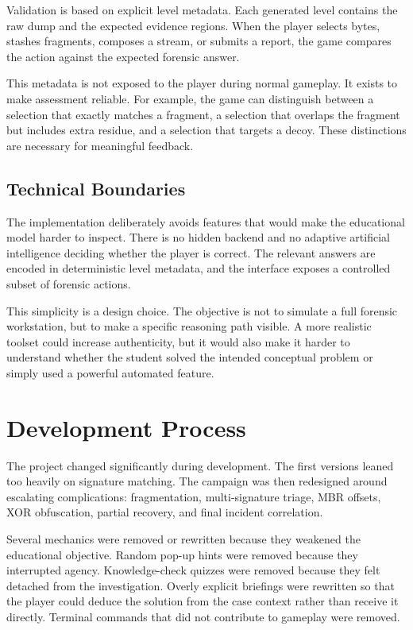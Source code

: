 \documentclass[11pt,a4paper]{article}
\begin{document}
Validation is based on explicit level metadata. Each generated level contains the raw dump and the expected evidence regions. When the player selects bytes, stashes fragments, composes a stream, or submits a report, the game compares the action against the expected forensic answer.

This metadata is not exposed to the player during normal gameplay. It exists to make assessment reliable. For example, the game can distinguish between a selection that exactly matches a fragment, a selection that overlaps the fragment but includes extra residue, and a selection that targets a decoy. These distinctions are necessary for meaningful feedback.

\subsection{Technical Boundaries}

The implementation deliberately avoids features that would make the educational model harder to inspect. There is no hidden backend and no adaptive artificial intelligence deciding whether the player is correct. The relevant answers are encoded in deterministic level metadata, and the interface exposes a controlled subset of forensic actions.

This simplicity is a design choice. The objective is not to simulate a full forensic workstation, but to make a specific reasoning path visible. A more realistic toolset could increase authenticity, but it would also make it harder to understand whether the student solved the intended conceptual problem or simply used a powerful automated feature.

\section{Development Process}

The project changed significantly during development. The first versions leaned too heavily on signature matching. The campaign was then redesigned around escalating complications: fragmentation, multi-signature triage, MBR offsets, XOR obfuscation, partial recovery, and final incident correlation.

Several mechanics were removed or rewritten because they weakened the educational objective. Random pop-up hints were removed because they interrupted agency. Knowledge-check quizzes were removed because they felt detached from the investigation. Overly explicit briefings were rewritten so that the player could deduce the solution from the case context rather than receive it directly. Terminal commands that did not contribute to gameplay were removed.
\end{document}
